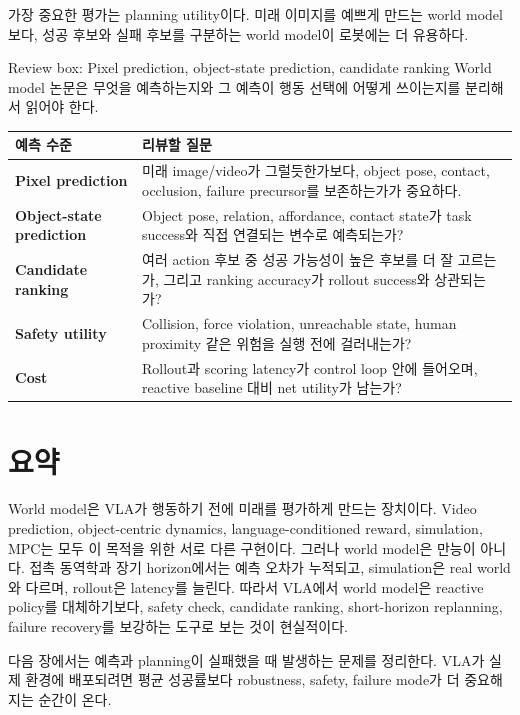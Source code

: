 가장 중요한 평가는 planning utility이다. 미래 이미지를 예쁘게 만드는 world model보다, 성공 후보와 실패 후보를 구분하는 world model이 로봇에는 더 유용하다.

\begin{casebox}{Review box: Pixel prediction, object-state prediction, candidate ranking}
World model 논문은 무엇을 예측하는지와 그 예측이 행동 선택에 어떻게 쓰이는지를 분리해서 읽어야 한다.

\vspace{0.5em}
\begin{tabularx}{\linewidth}{>{\bfseries}p{34mm}X}
  \toprule
  예측 수준 & 리뷰할 질문 \\
  \midrule
  Pixel prediction & 미래 image/video가 그럴듯한가보다, object pose, contact, occlusion, failure precursor를 보존하는가가 중요하다. \\
  Object-state prediction & Object pose, relation, affordance, contact state가 task success와 직접 연결되는 변수로 예측되는가? \\
  Candidate ranking & 여러 action 후보 중 성공 가능성이 높은 후보를 더 잘 고르는가, 그리고 ranking accuracy가 rollout success와 상관되는가? \\
  Safety utility & Collision, force violation, unreachable state, human proximity 같은 위험을 실행 전에 걸러내는가? \\
  Cost & Rollout과 scoring latency가 control loop 안에 들어오며, reactive baseline 대비 net utility가 남는가? \\
  \bottomrule
\end{tabularx}
\end{casebox}

\section{요약}

World model은 VLA가 행동하기 전에 미래를 평가하게 만드는 장치이다. Video prediction, object-centric dynamics, language-conditioned reward, simulation, MPC는 모두 이 목적을 위한 서로 다른 구현이다. 그러나 world model은 만능이 아니다. 접촉 동역학과 장기 horizon에서는 예측 오차가 누적되고, simulation은 real world와 다르며, rollout은 latency를 늘린다. 따라서 VLA에서 world model은 reactive policy를 대체하기보다, safety check, candidate ranking, short-horizon replanning, failure recovery를 보강하는 도구로 보는 것이 현실적이다.

다음 장에서는 예측과 planning이 실패했을 때 발생하는 문제를 정리한다. VLA가 실제 환경에 배포되려면 평균 성공률보다 robustness, safety, failure mode가 더 중요해지는 순간이 온다.

